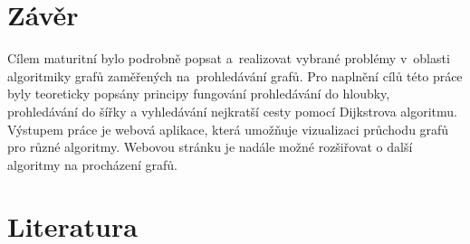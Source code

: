 \documentclass[12pt, titlepage, a4paper]{article}
\begin{document}
\clearpage
\section{Závěr}
Cílem maturitní bylo podrobně popsat a~realizovat vybrané problémy v~oblasti 
algoritmiky grafů zaměřených na~prohledávání grafů.
Pro naplnění cílů této práce byly teoreticky popsány principy fungování prohledávání do hloubky, 
prohledávání do šířky a vyhledávání nejkratší cesty pomocí Dijkstrova algoritmu. 
\\
Výstupem práce je webová aplikace, která umožňuje vizualizaci průchodu grafů pro různé algoritmy.
Webovou stránku je nadále možné rozšiřovat o další algoritmy na procházení grafů.
\clearpage
\section{Literatura}
\end{document}
